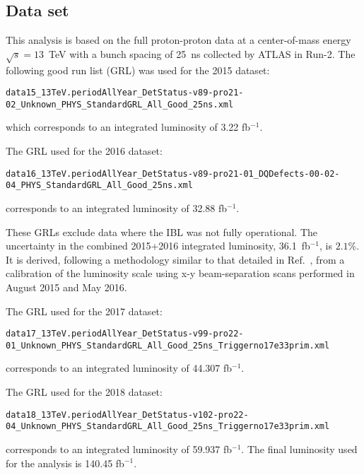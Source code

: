 \subsection{Data set}
\label{sec:dataset}

This analysis is based on the full proton-proton data at a center-of-mass energy $\sqrt{s}=13$~TeV with a bunch spacing of 25~ns collected by ATLAS in Run-2. The following good run list (GRL) was used for the 2015 dataset:


{\tt\scriptsize data15\_13TeV.periodAllYear\_DetStatus-v89-pro21-02\_Unknown\_PHYS\_StandardGRL\_All\_Good\_25ns.xml}

which corresponds to an integrated luminosity of 3.22 fb$^{-1}$.

The GRL used for the 2016 dataset:

{\tt\scriptsize data16\_13TeV.periodAllYear\_DetStatus-v89-pro21-01\_DQDefects-00-02-04\_PHYS\_StandardGRL\_All\_Good\_25ns.xml}

corresponds to an integrated luminosity of 32.88 fb$^{-1}$.

These GRLs exclude data where the IBL was not fully operational. The uncertainty in the combined 2015+2016 integrated luminosity, 36.1~fb$^{-1}$, is $2.1\%$. It is derived, following a methodology similar to that detailed in Ref.~\cite{DAPR-2013-01}, from a calibration of the luminosity scale using x-y beam-separation scans performed in August 2015 and May 2016.

The GRL used for the 2017 dataset:

{\tt\scriptsize data17\_13TeV.periodAllYear\_DetStatus-v99-pro22-01\_Unknown\_PHYS\_StandardGRL\_All\_Good\_25ns\_Triggerno17e33prim.xml}

corresponds to an integrated luminosity of 44.307 fb$^{-1}$.

The GRL used for the 2018 dataset:

{\tt\scriptsize  data18\_13TeV.periodAllYear\_DetStatus-v102-pro22-04\_Unknown\_PHYS\_StandardGRL\_All\_Good\_25ns\_Triggerno17e33prim.xml}

corresponds to an integrated luminosity of 59.937 fb$^{-1}$. The final luminosity used for the analysis is 140.45 fb$^{-1}$.

